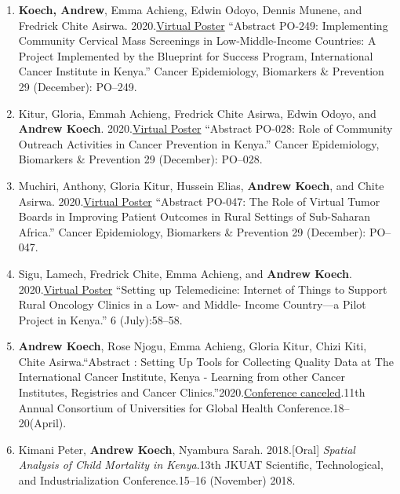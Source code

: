 \documentclass[13pt,]{article}
\begin{document}
\begin{enumerate}
\def\labelenumi{\arabic{enumi}.}
\item
  \textbf{Koech, Andrew}, Emma Achieng, Edwin Odoyo, Dennis Munene, and
  Fredrick Chite Asirwa.
  2020.\href{https://doi.org/10.1158/1538-7755.DISP20-PO-249}{Virtual
  Poster} ``Abstract PO-249: Implementing Community Cervical Mass
  Screenings in Low-Middle-Income Countries: A Project Implemented by
  the Blueprint for Success Program, International Cancer Institute in
  Kenya.'' Cancer Epidemiology, Biomarkers \& Prevention 29 (December):
  PO--249.
\item
  Kitur, Gloria, Emmah Achieng, Fredrick Chite Asirwa, Edwin Odoyo, and
  \textbf{Andrew Koech}.
  2020.\href{https://doi.org/10.1158/1538-7755.DISP20-PO-028}{Virtual
  Poster} ``Abstract PO-028: Role of Community Outreach Activities in
  Cancer Prevention in Kenya.'' Cancer Epidemiology, Biomarkers \&
  Prevention 29 (December): PO--028.
\item
  Muchiri, Anthony, Gloria Kitur, Hussein Elias, \textbf{Andrew Koech},
  and Chite Asirwa.
  2020.\href{https://doi.org/10.1158/1538-7755.DISP20-PO-047}{Virtual
  Poster} ``Abstract PO-047: The Role of Virtual Tumor Boards in
  Improving Patient Outcomes in Rural Settings of Sub-Saharan Africa.''
  Cancer Epidemiology, Biomarkers \& Prevention 29 (December): PO--047.
\item
  Sigu, Lamech, Fredrick Chite, Emma Achieng, and \textbf{Andrew Koech}.
  2020.\href{https://doi.org/10.1200/GO.20.54000}{Virtual Poster}
  ``Setting up Telemedicine: Internet of Things to Support Rural
  Oncology Clinics in a Low- and Middle- Income Country---a Pilot
  Project in Kenya.'' 6 (July):58--58.
\item
  \textbf{Andrew Koech}, Rose Njogu, Emma Achieng, Gloria Kitur, Chizi
  Kiti, Chite Asirwa.``Abstract : Setting Up Tools for Collecting
  Quality Data at The International Cancer Institute, Kenya - Learning
  from other Cancer Institutes, Registries and Cancer
  Clinics.''2020.\href{https://www.dropbox.com/s/lq0owvwya6dcjfh/1\%20CUGH\%202020\%20eBook_Abstracts_Global\%20Health\%20Education.pdf?dl=0}{Conference
  canceled}.11th Annual Consortium of Universities for Global Health
  Conference.18--20(April).
\item
  Kimani Peter, \textbf{Andrew Koech}, Nyambura Sarah. 2018.{[}Oral{]}
  \emph{Spatial Analysis of Child Mortality in Kenya}.13th JKUAT
  Scientific, Technological, and Industrialization Conference.15--16
  (November) 2018.
\end{enumerate}
\end{document}
